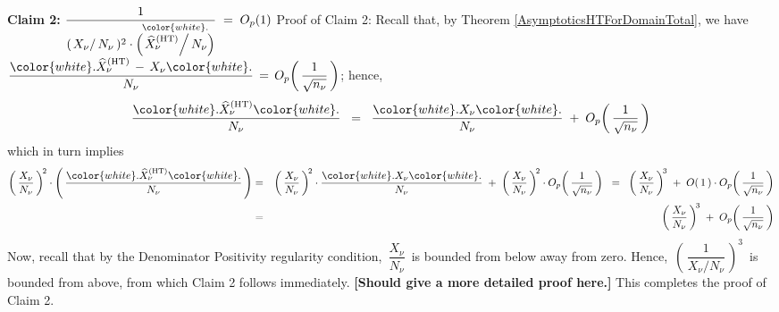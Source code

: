 \begin{enumerate}
    \vskip 0.3cm
    \noindent
    \textbf{Claim 2:}\quad
    $
    \dfrac{
        1
        }{
        (\left. X_{\nu}\right\slash N_{\nu}\,)^{2}
        \cdot
        \overset{{\color{white}.}}{
            \left(\left.\widehat{X}^{\textnormal{(HT)}}_{\nu}\right\slash N_{\nu}\right)
            }            
        }
    \; = \;
        O_{p}(1)
    $
    \vskip 0.1cm
    \noindent
    Proof of Claim 2:\;\;
    Recall that, by Theorem \ref{AsymptoticsHTForDomainTotal}, we have
    \;$
    \dfrac{
        {\color{white}.}
        \widehat{X}^{\textnormal{(HT)}}_{\nu}
        \, - \,
        X_{\nu}
        {\color{white}.}
        }{
        N_{\nu}
        }
    \, = \,
    O_{p}\!\left(\,\dfrac{1}{\sqrt{n_{\nu}}}\,\right)
    $;\;
    hence,
    \begin{equation*}
    \dfrac{
        {\color{white}.}
        \widehat{X}^{\textnormal{(HT)}}_{\nu}
        {\color{white}.}
        }{
        N_{\nu}
        }
    \;\; = \;\;
    \dfrac{
        {\color{white}.}
        X_{\nu}
        {\color{white}.}
        }{
        N_{\nu}
        }
    \; + \;
    O_{p}\!\left(\,\dfrac{1}{\sqrt{n_{\nu}}}\,\right)
    \end{equation*}
    which in turn implies
    \begin{eqnarray*}
    \left(\,
        \dfrac{X_{\nu}}{N_{\nu}}
        \,\right)^{\!2}
    \cdot
    \left(\,\dfrac{
        {\color{white}.}
        \widehat{X}^{\textnormal{(HT)}}_{\nu}
        {\color{white}.}
        }{
        N_{\nu}
        }\,\right)
    & = &
        \left(\,
            \dfrac{X_{\nu}}{N_{\nu}}
            \,\right)^{\!2}
        \cdot
        \dfrac{
            {\color{white}.}
            X_{\nu}
            {\color{white}.}
            }{
            N_{\nu}
            }
        \; + \;
        \left(\,
            \dfrac{X_{\nu}}{N_{\nu}}
            \,\right)^{\!2}
        \cdot
        O_{p}\!\left(\,\dfrac{1}{\sqrt{n_{\nu}}}\,\right)
    \;\; = \;\;
        \left(\,
            \dfrac{X_{\nu}}{N_{\nu}}
            \,\right)^{\!3}
        \; + \;
        O\!\left(\,1\,\right)
        \cdot
        O_{p}\!\left(\,\dfrac{1}{\sqrt{n_{\nu}}}\,\right)
    \\
    & = &
        \left(\,
            \dfrac{X_{\nu}}{N_{\nu}}
            \,\right)^{\!3}
        \; + \;
        O_{p}\!\left(\,\dfrac{1}{\sqrt{n_{\nu}}}\,\right)
    \end{eqnarray*}
    Now, recall that by the Denominator Positivity regularity condition,
    \,$\dfrac{X_{\nu}}{N_{\nu}}$\,
    is bounded from below away from zero.
    Hence,
    \,$\left(\,\dfrac{1}{X_{\nu} \slash N_{\nu}}\,\right)^{3}$\,
    is bounded from above, from which Claim 2 follows immediately.
    \textbf{\color{red}[Should give a more detailed proof here.]}
    This completes the proof of Claim 2.


\end{enumerate}
